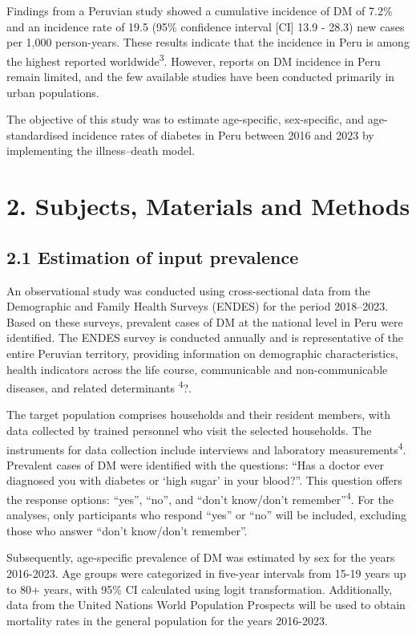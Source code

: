 \documentclass[
  letterpaper,
  DIV=11,
  numbers=noendperiod]{scrartcl}
\begin{document}
Findings from a Peruvian study showed a cumulative incidence of DM of
7.2\% and an incidence rate of 19.5 (95\% confidence interval {[}CI{]}
13.9 - 28.3) new cases per 1,000 person-years. These results indicate
that the incidence in Peru is among the highest reported
worldwide\textsuperscript{3}. However, reports on DM incidence in Peru
remain limited, and the few available studies have been conducted
primarily in urban populations.

The objective of this study was to estimate age-specific, sex-specific,
and age-standardised incidence rates of diabetes in Peru between 2016
and 2023 by implementing the illness--death model.

\section{2. Subjects, Materials and
Methods}\label{subjects-materials-and-methods}

\subsection{2.1 Estimation of input
prevalence}\label{estimation-of-input-prevalence}

An observational study was conducted using cross-sectional data from the
Demographic and Family Health Surveys (ENDES) for the period 2018--2023.
Based on these surveys, prevalent cases of DM at the national level in
Peru were identified. The ENDES survey is conducted annually and is
representative of the entire Peruvian territory, providing information
on demographic characteristics, health indicators across the life
course, communicable and non-communicable diseases, and related
determinants \textsuperscript{4}?.

The target population comprises households and their resident members,
with data collected by trained personnel who visit the selected
households. The instruments for data collection include interviews and
laboratory measurements\textsuperscript{4}. Prevalent cases of DM were
identified with the questions: ``Has a doctor ever diagnosed you with
diabetes or `high sugar' in your blood?''. This question offers the
response options: ``yes'', ``no'', and ``don't know/don't
remember''\textsuperscript{4}. For the analyses, only participants who
respond ``yes'' or ``no'' will be included, excluding those who answer
``don't know/don't remember''.

Subsequently, age-specific prevalence of DM was estimated by sex for the
years 2016-2023. Age groups were categorized in five-year intervals from
15-19 years up to 80+ years, with 95\% CI calculated using logit
transformation. Additionally, data from the United Nations World
Population Prospects will be used to obtain mortality rates in the
general population for the years 2016-2023.
\end{document}
